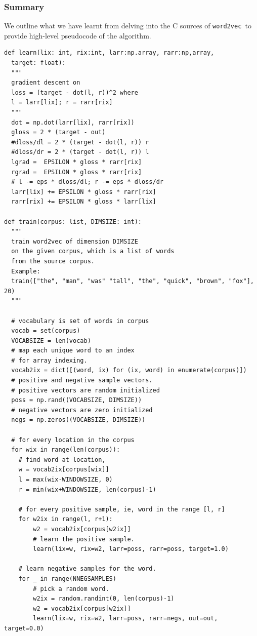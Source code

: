 \documentclass[11pt]{book}
\newcommand{\wtov}{\texttt{word2vec }}
\begin{document}
\subsubsection{Summary}

We outline what we have learnt from delving into the C sources
of \wtov to provide high-level pseudocode of the algorithm.
\begin{verbatim}
def learn(lix: int, rix:int, larr:np.array, rarr:np,array,
  target: float):
  """
  gradient descent on 
  loss = (target - dot(l, r))^2 where
  l = larr[lix]; r = rarr[rix]
  """
  dot = np.dot(larr[lix], rarr[rix])
  gloss = 2 * (target - out)
  #dloss/dl = 2 * (target - dot(l, r)) r
  #dloss/dr = 2 * (target - dot(l, r)) l
  lgrad =  EPSILON * gloss * rarr[rix]
  rgrad =  EPSILON * gloss * rarr[rix]
  # l -= eps * dloss/dl; r -= eps * dloss/dr
  larr[lix] += EPSILON * gloss * rarr[rix]
  rarr[rix] += EPSILON * gloss * larr[lix]

def train(corpus: list, DIMSIZE: int):
  """
  train word2vec of dimension DIMSIZE 
  on the given corpus, which is a list of words
  from the source corpus.
  Example:
  train(["the", "man", "was" "tall", "the", "quick", "brown", "fox"], 20)
  """

  # vocabulary is set of words in corpus
  vocab = set(corpus) 
  VOCABSIZE = len(vocab)
  # map each unique word to an index
  # for array indexing.
  vocab2ix = dict([(word, ix) for (ix, word) in enumerate(corpus)])
  # positive and negative sample vectors.
  # positive vectors are random initialized
  poss = np.rand((VOCABSIZE, DIMSIZE))
  # negative vectors are zero initialized
  negs = np.zeros((VOCABSIZE, DIMSIZE))

  # for every location in the corpus
  for wix in range(len(corpus)):
    # find word at location, 
    w = vocab2ix[corpus[wix]]
    l = max(wix-WINDOWSIZE, 0)
    r = min(wix+WINDOWSIZE, len(corpus)-1)

    # for every positive sample, ie, word in the range [l, r]
    for w2ix in range(l, r+1):
        w2 = vocab2ix[corpus[w2ix]]
        # learn the positive sample.
        learn(lix=w, rix=w2, larr=poss, rarr=poss, target=1.0)

    # learn negative samples for the word.
    for _ in range(NNEGSAMPLES)
        # pick a random word.
        w2ix = random.randint(0, len(corpus)-1)
        w2 = vocab2ix[corpus[w2ix]]
        learn(lix=w, rix=w2, larr=poss, rarr=negs, out=out, target=0.0)
\end{verbatim}
\end{document}
